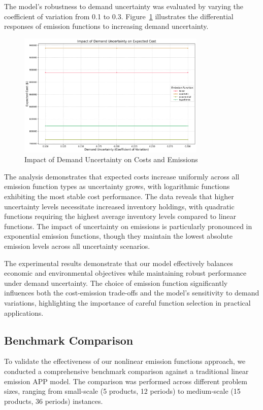 The model's robustness to demand uncertainty was evaluated by varying the coefficient of variation from 0.1 to 0.3. Figure~\ref{fig:demand_uncertainty_impact} illustrates the differential responses of emission functions to increasing demand uncertainty.
\begin{figure}[htbp]
\centering
\includegraphics[width=0.8\textwidth]{images/demand_uncertainty_impact.pdf}
\caption{Impact of Demand Uncertainty on Costs and Emissions}
\label{fig:demand_uncertainty_impact}
\end{figure}

The analysis demonstrates that expected costs increase uniformly across all emission function types as uncertainty grows, with logarithmic functions exhibiting the most stable cost performance. The data reveals that higher uncertainty levels necessitate increased inventory holdings, with quadratic functions requiring the highest average inventory levels compared to linear functions. The impact of uncertainty on emissions is particularly pronounced in exponential emission functions, though they maintain the lowest absolute emission levels across all uncertainty scenarios.

The experimental results demonstrate that our model effectively balances economic and environmental objectives while maintaining robust performance under demand uncertainty. The choice of emission function significantly influences both the cost-emission trade-offs and the model's sensitivity to demand variations, highlighting the importance of careful function selection in practical applications.

\subsection{Benchmark Comparison}
To validate the effectiveness of our nonlinear emission functions approach, we conducted a comprehensive benchmark comparison against a traditional linear emission APP model. The comparison was performed across different problem sizes, ranging from small-scale (5 products, 12 periods) to medium-scale (15 products, 36 periods) instances.

